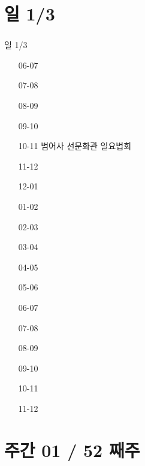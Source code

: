 \documentclass[aspectratio=1610,20pt,xcolor=pdftex,dvipsnames,table,handout]{beamer}
\begin{document}
	\section{일 1/3}											
	\begin{frame} [t,plain]											
	\frametitle{}											
		\begin{block} {일 1/3}										
		\setlength{\leftmargini}{3em}										
		\begin{itemize}										
			\item [06-07] \hrulefill									
			\item [07-08] \hrulefill									
			\item [08-09] \hrulefill									
			\item [09-10] \hrulefill									
			\item [10-11] \hrulefill			범어사 선문화관 일요법회						
			\item [11-12] \hrulefill									
			\item [12-01] \hrulefill									
			\item [01-02] \hrulefill									
			\item [02-03] \hrulefill									
			\item [03-04] \hrulefill									
			\item [04-05] \hrulefill									
			\item [05-06] \hrulefill									
			\item [06-07] \hrulefill									
			\item [07-08] \hrulefill									
			\item [08-09] \hrulefill									
			\item [09-10] \hrulefill									
			\item [10-11] \hrulefill									
			\item [11-12] \hrulefill									
		\end{itemize}										
		\end{block}										
	\end{frame}											




		\section{	주간 
					01 / 52 째주 }	%
\end{document}
